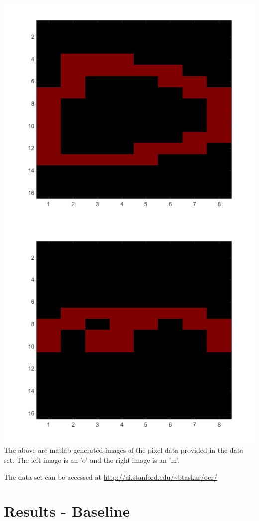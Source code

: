 \documentclass{article} %
\begin{document}
\includegraphics[scale=0.4]{o.png}
\includegraphics[scale=0.4]{m.png}
The above are matlab-generated images of the pixel data provided in the data set. The left image is an 'o' and the right image is an 'm'.


The data set can be accessed at \url{http://ai.stanford.edu/~btaskar/ocr/}

\section{Results - Baseline}
\end{document}
